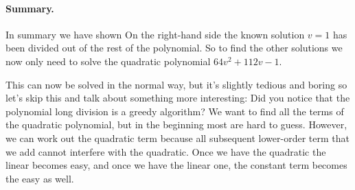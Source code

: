 \paragraph{Summary.}In summary we have shown
On the right-hand side the known solution $v=1$ has been divided out of the rest of the polynomial. So to find the other solutions we now only need to solve the quadratic polynomial 
$64v^2+112v-1$. 

This can now be solved in the normal way, but it's slightly tedious and boring so let's skip this and talk about something more interesting: Did you notice that the polynomial long division is a greedy algorithm? We want to find all the terms of the quadratic polynomial, but in the beginning most are hard to guess. However, we can work out the quadratic term because all subsequent lower-order term that we add cannot interfere with the quadratic. Once we have the quadratic the linear becomes easy, and once we have the linear one, the constant term becomes the easy as well. 
